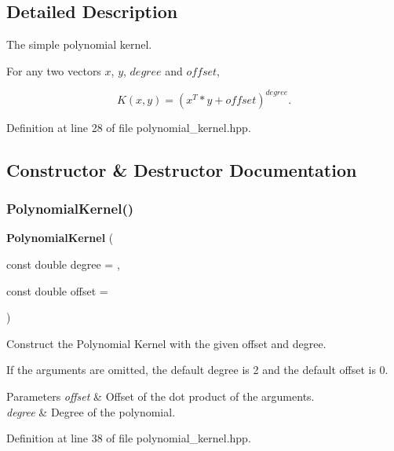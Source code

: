 \subsection{Detailed Description}
The simple polynomial kernel. 

For any two vectors $ x $, $ y $, $ degree $ and $ offset $,

\[ K(x, y) = (x^T * y + offset) ^ {degree}. \] 

Definition at line 28 of file polynomial\+\_\+kernel.\+hpp.



\subsection{Constructor \& Destructor Documentation}
\mbox{\label{classmlpack_1_1kernel_1_1PolynomialKernel_af759f8b4e6594aed10ad2cea9435aed2}} 
\subsubsection{Polynomial\+Kernel()}
{\footnotesize\ttfamily \textbf{ Polynomial\+Kernel} (\begin{DoxyParamCaption}\item[{const double}]{degree = {},  }\item[{const double}]{offset = {} }\end{DoxyParamCaption})\hspace{0.3cm}{\ttfamily [inline]}}



Construct the Polynomial Kernel with the given offset and degree. 

If the arguments are omitted, the default degree is 2 and the default offset is 0.


\begin{DoxyParams}{Parameters}
{\em offset} & Offset of the dot product of the arguments. \\
\hline
{\em degree} & Degree of the polynomial. \\
\hline
\end{DoxyParams}


Definition at line 38 of file polynomial\+\_\+kernel.\+hpp.



